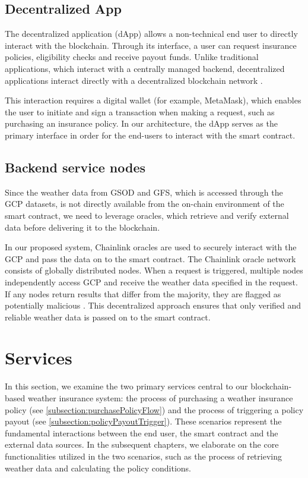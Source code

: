 \subsection{Decentralized App}\label{subsection:decentralizedApp}
The decentralized application (dApp) allows a non-technical end user to directly interact with the blockchain. Through its interface, a user can request insurance policies, eligibility checks and receive payout funds. Unlike traditional applications, which interact with a centrally managed backend, decentralized applications interact directly with a decentralized blockchain network \autocite{Wu2019A}.

This interaction requires a digital wallet (for example, MetaMask), which enables the user to initiate and sign a transaction when making a request, such as purchasing an insurance policy. In our architecture, the dApp serves as the primary interface in order for the end-users to interact with the smart contract. 

\subsection{Backend service nodes}\label{subsection:ChainlinkOracle}
Since the weather data from GSOD and GFS, which is accessed through the GCP datasets, is not directly available from the on-chain environment of the smart contract, we need to leverage oracles, which retrieve and verify external data before delivering it to the blockchain.

In our proposed system, Chainlink oracles are used to securely interact with the GCP and pass the data on to the smart contract. The Chainlink oracle network consists of globally distributed nodes. When a request is triggered, multiple nodes independently access GCP and receive the weather data specified in the request. If any nodes return results that differ from the majority, they are flagged as potentially malicious \autocite{breidenbach2021chainlink}. This decentralized approach ensures that only verified and reliable weather data is passed on to the smart contract.

\section{Services}\label{services}
In this section, we examine the two primary services central to our blockchain-based weather insurance system: the process of purchasing a weather insurance policy (see \cref{subsection:purchasePolicyFlow}) and the process of triggering a policy payout (see \cref{subsection:policyPayoutTrigger}). These scenarios represent the fundamental interactions between the end user, the smart contract and the external data sources. In the subsequent chapters, we elaborate on the core functionalities utilized in the two scenarios, such as the process of retrieving weather data and calculating the policy conditions.


